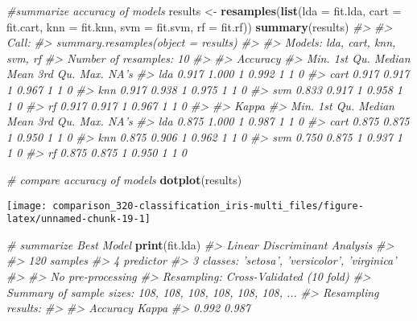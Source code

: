 \documentclass[]{book}
\newenvironment{Shaded}{\begin{snugshade}}{\end{snugshade}}
\newcommand{\CommentTok}[1]{\textcolor[rgb]{0.56,0.35,0.01}{\textit{#1}}}
\newcommand{\DataTypeTok}[1]{\textcolor[rgb]{0.13,0.29,0.53}{#1}}
\newcommand{\KeywordTok}[1]{\textcolor[rgb]{0.13,0.29,0.53}{\textbf{#1}}}
\newcommand{\NormalTok}[1]{#1}
\newcommand{\StringTok}[1]{\textcolor[rgb]{0.31,0.60,0.02}{#1}}
\begin{document}
\begin{Shaded}
\begin{Highlighting}[]
\CommentTok{#summarize accuracy of models}
\NormalTok{results <-}\StringTok{ }\KeywordTok{resamples}\NormalTok{(}\KeywordTok{list}\NormalTok{(}\DataTypeTok{lda  =}\NormalTok{ fit.lda, }
                          \DataTypeTok{cart =}\NormalTok{ fit.cart, }
                          \DataTypeTok{knn  =}\NormalTok{ fit.knn, }
                          \DataTypeTok{svm  =}\NormalTok{ fit.svm, }
                          \DataTypeTok{rf   =}\NormalTok{ fit.rf))}
\KeywordTok{summary}\NormalTok{(results)}
\CommentTok{#> }
\CommentTok{#> Call:}
\CommentTok{#> summary.resamples(object = results)}
\CommentTok{#> }
\CommentTok{#> Models: lda, cart, knn, svm, rf }
\CommentTok{#> Number of resamples: 10 }
\CommentTok{#> }
\CommentTok{#> Accuracy }
\CommentTok{#>       Min. 1st Qu. Median  Mean 3rd Qu. Max. NA's}
\CommentTok{#> lda  0.917   1.000      1 0.992       1    1    0}
\CommentTok{#> cart 0.917   0.917      1 0.967       1    1    0}
\CommentTok{#> knn  0.917   0.938      1 0.975       1    1    0}
\CommentTok{#> svm  0.833   0.917      1 0.958       1    1    0}
\CommentTok{#> rf   0.917   0.917      1 0.967       1    1    0}
\CommentTok{#> }
\CommentTok{#> Kappa }
\CommentTok{#>       Min. 1st Qu. Median  Mean 3rd Qu. Max. NA's}
\CommentTok{#> lda  0.875   1.000      1 0.987       1    1    0}
\CommentTok{#> cart 0.875   0.875      1 0.950       1    1    0}
\CommentTok{#> knn  0.875   0.906      1 0.962       1    1    0}
\CommentTok{#> svm  0.750   0.875      1 0.937       1    1    0}
\CommentTok{#> rf   0.875   0.875      1 0.950       1    1    0}
\end{Highlighting}
\end{Shaded}

\begin{Shaded}
\begin{Highlighting}[]
\CommentTok{# compare accuracy of models}
\KeywordTok{dotplot}\NormalTok{(results)}
\end{Highlighting}
\end{Shaded}

\begin{center}\texttt{[image: comparison\_320-classification\_iris-multi\_files/figure-latex/unnamed-chunk-19-1]} \end{center}

\begin{Shaded}
\begin{Highlighting}[]
\CommentTok{# summarize Best Model}
\KeywordTok{print}\NormalTok{(fit.lda)}
\CommentTok{#> Linear Discriminant Analysis }
\CommentTok{#> }
\CommentTok{#> 120 samples}
\CommentTok{#>   4 predictor}
\CommentTok{#>   3 classes: 'setosa', 'versicolor', 'virginica' }
\CommentTok{#> }
\CommentTok{#> No pre-processing}
\CommentTok{#> Resampling: Cross-Validated (10 fold) }
\CommentTok{#> Summary of sample sizes: 108, 108, 108, 108, 108, 108, ... }
\CommentTok{#> Resampling results:}
\CommentTok{#> }
\CommentTok{#>   Accuracy  Kappa}
\CommentTok{#>   0.992     0.987}
\end{Highlighting}
\end{Shaded}
\end{document}
